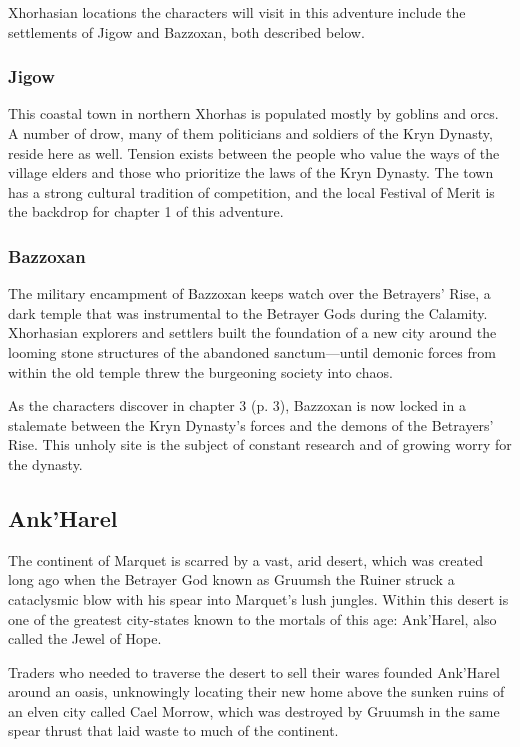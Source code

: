 \documentclass[a4paper, 11pt, bg=full, twocolumn, nooutline]{dndbook}
\begin{document}
Xhorhasian locations the characters will visit in this adventure include the settlements of Jigow and Bazzoxan, both described below.

\subsubsection{Jigow}

This coastal town in northern Xhorhas is populated mostly by goblins and orcs. A number of drow, many of them politicians and soldiers of the Kryn Dynasty, reside here as well. Tension exists between the people who value the ways of the village elders and those who prioritize the laws of the Kryn Dynasty. The town has a strong cultural tradition of competition, and the local Festival of Merit is the backdrop for chapter 1 of this adventure.

\subsubsection{Bazzoxan}

The military encampment of Bazzoxan keeps watch over the Betrayers' Rise, a dark temple that was instrumental to the Betrayer Gods during the Calamity. Xhorhasian explorers and settlers built the foundation of a new city around the looming stone structures of the abandoned sanctum---until demonic forces from within the old temple threw the burgeoning society into chaos.

As the characters discover in chapter 3 (p. 3), Bazzoxan is now locked in a stalemate between the Kryn Dynasty's forces and the demons of the Betrayers' Rise. This unholy site is the subject of constant research and of growing worry for the dynasty.

\subsection{Ank'Harel}

The continent of Marquet is scarred by a vast, arid desert, which was created long ago when the Betrayer God known as Gruumsh the Ruiner struck a cataclysmic blow with his spear into Marquet's lush jungles. Within this desert is one of the greatest city-states known to the mortals of this age: Ank'Harel, also called the Jewel of Hope.

Traders who needed to traverse the desert to sell their wares founded Ank'Harel around an oasis, unknowingly locating their new home above the sunken ruins of an elven city called Cael Morrow, which was destroyed by Gruumsh in the same spear thrust that laid waste to much of the continent.
\end{document}
